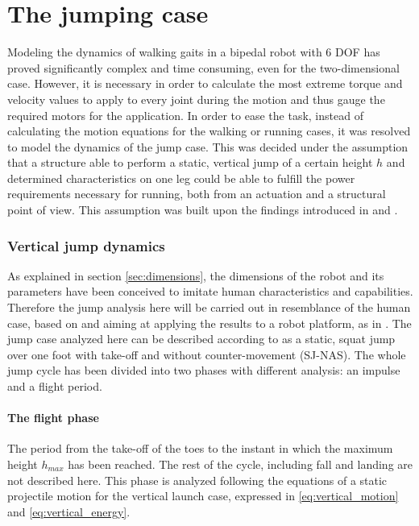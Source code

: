 
\section{The jumping case} %
\label{sec:jumping_case}
Modeling the dynamics of walking gaits in a bipedal robot with 6 DOF has proved significantly complex and time consuming, even for the two-dimensional case.
However, it is necessary in order to calculate the most extreme torque and velocity values to apply to every joint during the motion and thus gauge the required motors for the application.
In order to ease the task, instead of calculating the motion equations for the walking or running cases, it was resolved to model the dynamics of the jump case.
This was decided under the assumption that a structure able to perform a static, vertical jump of a certain height $h$ and determined characteristics on one leg could be able to fulfill the power requirements necessary for running, both from an actuation and a structural point of view.
This assumption was built upon the findings introduced in \cite{jump-run1} and \cite{jump-run2}.

\subsubsection{Vertical jump dynamics} %
\label{ssub:static_jumping_dynamics}
As explained in section \ref{sec:dimensions}, the dimensions of the robot and its parameters have been conceived to imitate human characteristics and capabilities.
Therefore the jump analysis here will be carried out in resemblance of the human case, based on \cite{jump-dynamics1} and aiming at applying the results to a robot platform, as in \cite{jump-dynamics2}.
The jump case analyzed here can be described according to \cite{jump-dynamics1} as a static, squat jump over one foot with take-off and without counter-movement (SJ-NAS).
The whole jump cycle has been divided into two phases with different analysis: an impulse and a flight period.

\paragraph{The flight phase}
The period from the take-off of the toes to the instant in which the maximum height $h_{max}$ has been reached. 
The rest of the cycle, including fall and landing are not described here.
This phase is analyzed following the equations of a static projectile motion for the vertical launch case, expressed in \ref{eq:vertical_motion} and \ref{eq:vertical_energy}.

